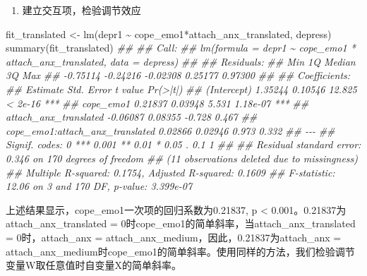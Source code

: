 \documentclass[
  chinese-hans,
  letterpaper,
  DIV=11,
  numbers=noendperiod]{scrartcl}
\newenvironment{Shaded}{\begin{snugshade}}{\end{snugshade}}
\newcommand{\DocumentationTok}[1]{\textcolor[rgb]{0.37,0.37,0.37}{\textit{#1}}}
\newcommand{\FunctionTok}[1]{\textcolor[rgb]{0.28,0.35,0.67}{#1}}
\newcommand{\NormalTok}[1]{\textcolor[rgb]{0.00,0.23,0.31}{#1}}
\newcommand{\OtherTok}[1]{\textcolor[rgb]{0.00,0.23,0.31}{#1}}
\newcommand{\SpecialCharTok}[1]{\textcolor[rgb]{0.37,0.37,0.37}{#1}}
\providecommand{\tightlist}{%
  \setlength{\itemsep}{0pt}\setlength{\parskip}{0pt}}
\begin{document}
\begin{enumerate}
\def\labelenumi{\arabic{enumi}.}
\setcounter{enumi}{1}
\tightlist
\item
  建立交互项，检验调节效应
\end{enumerate}

\begin{Shaded}
\begin{Highlighting}[numbers=left,,]
\NormalTok{fit\_translated }\OtherTok{\textless{}{-}} \FunctionTok{lm}\NormalTok{(depr1 }\SpecialCharTok{\textasciitilde{}}\NormalTok{ cope\_emo1}\SpecialCharTok{*}\NormalTok{attach\_anx\_translated, depress)}
\FunctionTok{summary}\NormalTok{(fit\_translated)}
\DocumentationTok{\#\# }
\DocumentationTok{\#\# Call:}
\DocumentationTok{\#\# lm(formula = depr1 \textasciitilde{} cope\_emo1 * attach\_anx\_translated, data = depress)}
\DocumentationTok{\#\# }
\DocumentationTok{\#\# Residuals:}
\DocumentationTok{\#\#      Min       1Q   Median       3Q      Max }
\DocumentationTok{\#\# {-}0.75114 {-}0.24216 {-}0.02308  0.25177  0.97300 }
\DocumentationTok{\#\# }
\DocumentationTok{\#\# Coefficients:}
\DocumentationTok{\#\#                                 Estimate Std. Error t value Pr(\textgreater{}|t|)    }
\DocumentationTok{\#\# (Intercept)                      1.35244    0.10546  12.825  \textless{} 2e{-}16 ***}
\DocumentationTok{\#\# cope\_emo1                        0.21837    0.03948   5.531 1.18e{-}07 ***}
\DocumentationTok{\#\# attach\_anx\_translated           {-}0.06087    0.08355  {-}0.728    0.467    }
\DocumentationTok{\#\# cope\_emo1:attach\_anx\_translated  0.02866    0.02946   0.973    0.332    }
\DocumentationTok{\#\# {-}{-}{-}}
\DocumentationTok{\#\# Signif. codes:  0 \textquotesingle{}***\textquotesingle{} 0.001 \textquotesingle{}**\textquotesingle{} 0.01 \textquotesingle{}*\textquotesingle{} 0.05 \textquotesingle{}.\textquotesingle{} 0.1 \textquotesingle{} \textquotesingle{} 1}
\DocumentationTok{\#\# }
\DocumentationTok{\#\# Residual standard error: 0.346 on 170 degrees of freedom}
\DocumentationTok{\#\#   (11 observations deleted due to missingness)}
\DocumentationTok{\#\# Multiple R{-}squared:  0.1754, Adjusted R{-}squared:  0.1609 }
\DocumentationTok{\#\# F{-}statistic: 12.06 on 3 and 170 DF,  p{-}value: 3.399e{-}07}
\end{Highlighting}
\end{Shaded}

上述结果显示，cope\_emo1一次项的回归系数为0.21837, p \textless{}
0.001。0.21837为attach\_anx\_translated =
0时cope\_emo1的简单斜率，当attach\_anx\_translated = 0时，attach\_anx =
attach\_anx\_medium，因此，0.21837为attach\_anx =
attach\_anx\_medium时cope\_emo1的简单斜率。使用同样的方法，我们检验调节变量W取任意值时自变量X的简单斜率。
\end{document}
